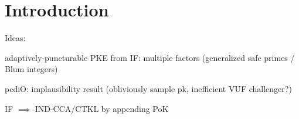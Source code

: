 \section{Introduction}
\label{sec:intro}

Ideas:
\begin{sitemize}
    \item adaptively-puncturable PKE from IF: multiple factors (generalized safe primes / Blum integers)
    \item pcdiO: implausibility result (obliviously sample pk, inefficient VUF challenger?)
    \item IF \(\implies\) IND-CCA/CTKL by appending PoK
\end{sitemize}